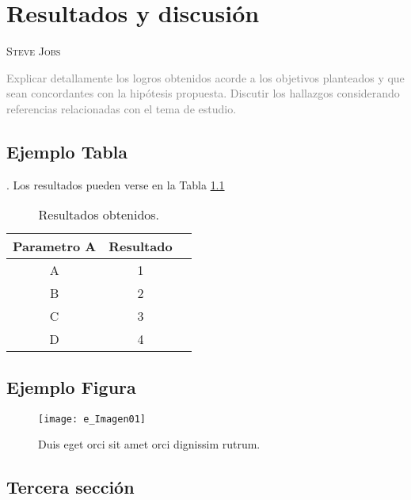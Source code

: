 \chapter{Resultados y discusión}
              {\textsc{Steve Jobs}}


\textcolor{gray}{Explicar detallamente los logros obtenidos acorde a los objetivos planteados y que sean concordantes con la hipótesis propuesta. Discutir los hallazgos considerando referencias relacionadas con el 
tema de estudio.}

\section{Ejemplo Tabla}
\lipsum[1].  
Los resultados pueden verse en la Tabla \ref{tab:Tabla1}

\begin{table}[htbp]
\centering
\caption{Resultados obtenidos.}
\label{tab:pversust}
\begin{tabular}{ccc}
\toprule
\textbf{Parametro A } & \textbf{Resultado } \\
\midrule
A & 1 \\
B & 2 \\ 
C & 3 \\
D & 4 \\
\bottomrule
\end{tabular}
\label{tab:Tabla1}
\end{table}

\lipsum[2]

\section{Ejemplo Figura}
\lipsum[3-4]

\begin{figure}[htbp]
\centering
\texttt{[image: e\_Imagen01]}
\caption{Duis eget orci sit amet orci dignissim rutrum.}
\label{fig:particion}
\end{figure}

\section{Tercera sección}
\lipsum[5-6]
